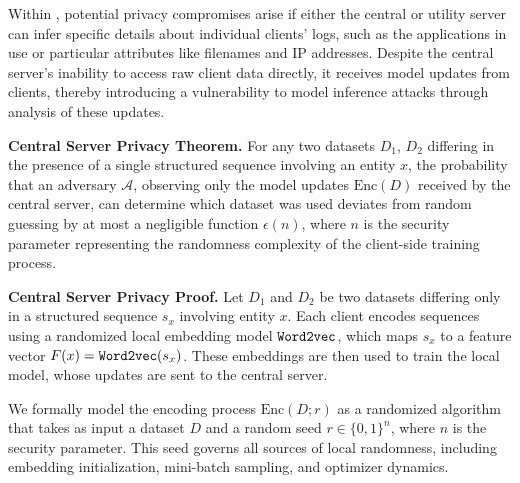  Within \Sys, potential privacy compromises arise if either the central or utility server can infer specific details about individual clients' logs, such as the applications in use or particular attributes like filenames and IP addresses. Despite the central server's inability to access raw client data directly, it receives model updates from clients, thereby introducing a vulnerability to model inference attacks through analysis of these updates.



\textbf{Central Server Privacy Theorem.}  
For any two datasets \(D_1\), \(D_2\) differing in the presence of a single structured sequence involving an entity \(x\), the probability that an adversary \(\mathcal{A}\), observing only the model updates \(\text{Enc}(D)\) received by the central server, can determine which dataset was used deviates from random guessing by at most a negligible function \(\epsilon(n)\), where \(n\) is the security parameter representing the randomness complexity of the client-side training process.

\textbf{Central Server Privacy Proof.}  
Let \(D_1\) and \(D_2\) be two datasets differing only in a structured sequence \(s_x\) involving entity \(x\). Each client encodes sequences using a randomized local embedding model \(\texttt{Word2vec}\), which maps \(s_x\) to a feature vector \(F(x) = \texttt{Word2vec}(s_x)\). These embeddings are then used to train the local model, whose updates are sent to the central server.

We formally model the encoding process \(\text{Enc}(D; r)\) as a randomized algorithm that takes as input a dataset \(D\) and a random seed \(r \in \{0,1\}^n\), where \(n\) is the security parameter. This seed governs all sources of local randomness, including embedding initialization, mini-batch sampling, and optimizer dynamics. 

